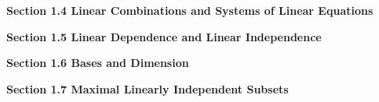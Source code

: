 \documentclass[11pt,largemargins]{homework}
\begin{document}
\question


\hfill 

\textbf{\large{Section 1.4} Linear Combinations and Systems of Linear Equations}
\setcounter{questionCounter}{0}
\question

\question

\question

\question

\question


\hfill 

\textbf{\large{Section 1.5} Linear Dependence and Linear Independence}
\setcounter{questionCounter}{0}
\question

\question

\question

\question

\question


\hfill 

\textbf{\large{Section 1.6} Bases and Dimension}
\setcounter{questionCounter}{0}
\question

\question

\question

\question

\question


\hfill 

\textbf{\large{Section 1.7} Maximal Linearly Independent Subsets}
\setcounter{questionCounter}{0}
\question

\question

\question

\question

\question

\question

\question

\question

\question

\question
\end{document}
